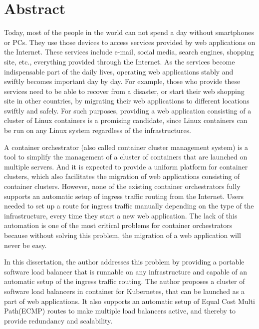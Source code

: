\chapter*{Abstract}

Today, most of the people in the world can not spend a day without smartphones or PCs.
They use those devices to access services provided by web applications on the Internet.
These services include e-mail, social media, search engines, shopping site, etc., everything provided through the Internet.
As the services become indispensable part of the daily lives, operating web applications stably and swiftly becomes important day by day.
For example, those who provide these services need to be able to recover from a disaster, or start their web shopping site in other countries,
by migrating their web applications to different locations swiftly and safely.
For such purposes, providing a web application consisting of a cluster of Linux containers is a promising candidate, since Linux containers can be run on any Linux system regardless of the infrastructures.


A container orchestrator (also called container cluster management system) is a tool to simplify the management of a cluster of containers that are launched on multiple servers.
And it is expected to provide a uniform platform for container clusters, which also facilitates the migration of web applications consisting of container clusters.
However, none of the existing container orchestrators fully supports an automatic setup of ingress traffic routing from the Internet.
Users needed to set up a route for ingress traffic manually depending on the type of the infrastructure, every time they start a new web application.
The lack of this automation is one of the most critical problems for container orchestrators because without solving this problem, the migration of a web application will never be easy.

In this dissertation, the author addresses this problem by providing a portable software load balancer that is runnable on any infrastructure and capable of an automatic setup of the ingress traffic routing.
The author proposes a cluster of software load balancers in container for Kubernetes, that can be launched as a part of web applications.
It also supports an automatic setup of Equal Cost Multi Path(ECMP) routes to make multiple load balancers active, and thereby to provide redundancy and scalability.


